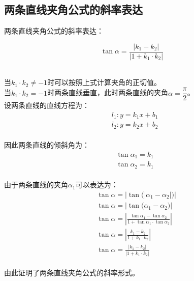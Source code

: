 \documentclass[UTF8]{ctexart}
\begin{document}
\subsection{两条直线夹角公式的斜率表达}
    \setcounter{equation}{0}
    两条直线夹角公式的斜率表达：
    \begin{large}
        \begin{equation*}
            \tan{\alpha}=\frac{|k_1-k_2|}{|1+k_1\cdot k_2|}
        \end{equation*}
    \end{large}\\
    当$k_1\cdot k_2\neq -1$时可以按照上式计算夹角的正切值。\\[3mm]
    当$k_1\cdot k_2=-1$时两条直线垂直，此时两条直线的夹角$\alpha=\dfrac{\pi}{2}$。\\[6mm]
    设两条直线的直线方程为：
    \begin{align}
        &l_1:y=k_1x+b_1\\[3mm]
        &l_2:y=k_2x+b_2
    \end{align}\\
    因此两条直线的倾斜角为：
    \begin{align}
        &\tan\alpha_1=k_1\\[3mm]
        &\tan\alpha_2=k_1
    \end{align}\\
    由于两条直线的夹角$\alpha_1$可以表达为：\vspace{3pt}
    \begin{align}
        &~~\tan{\alpha}=\Big|\tan{\big(|\alpha_1-\alpha_2|\big)}\Big|\\[8mm]
        &~~\tan{\alpha}=\Big|\tan{\big(\alpha_1-\alpha_2\big)}\Big|\\[8mm]
        &~~\tan{\alpha}=\left|\frac{\tan{\alpha_1}-\tan{\alpha_2}}{1+\tan{\alpha_1}\cdot\tan{\alpha_2}}\right|\\[8mm]
        &~~\tan{\alpha}=\left|\frac{k_1-k_2}{1+k_1\cdot k_2}\right|\\[8mm]
        &~~\tan{\alpha}=\frac{|k_1-k_2|}{|1+k_1\cdot k_2|}
    \end{align}\\
    由此证明了两条直线夹角公式的斜率形式。

\newpage
\end{document}
